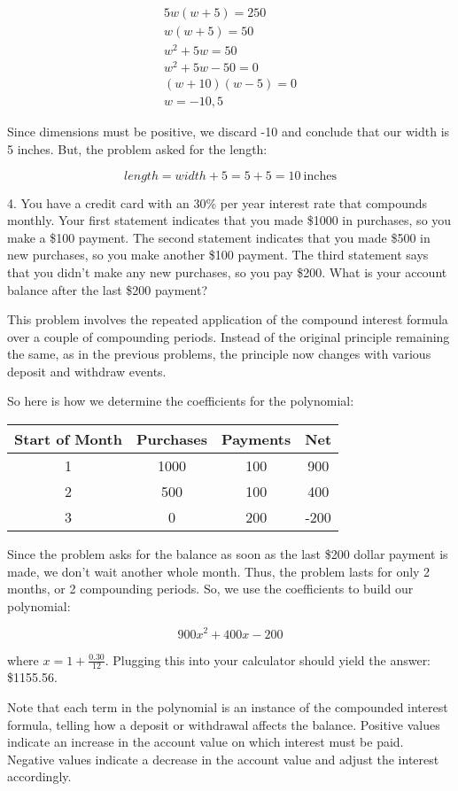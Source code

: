 \documentclass[letterpaper, 12pt]{article}
\begin{document}
\begin{eqnarray*}
5w(w+5)=250 \\
w(w+5)=50 \\
w^2+5w=50 \\
w^2+5w-50=0 \\
(w+10)(w-5)=0 \\
w=-10,5
\end{eqnarray*}

Since dimensions must be positive, we discard -10 and conclude that our width
is 5 inches. But, the problem asked for the length:

\[length=width+5=5+5=10\ \mbox{inches}\]

4. You have a credit card with an 30\% per year interest rate that compounds
monthly. Your first statement indicates that you made \$1000 in purchases, so
you make a \$100 payment.  The second statement indicates that you made \$500 in
new purchases, so you make another \$100 payment. The third statement says that
you didn't make any new purchases, so you pay \$200.  What is your account
balance after the last \$200 payment?

\bigskip

This problem involves the repeated application of the compound interest formula
over a couple of compounding periods.  Instead of the original principle
remaining the same, as in the previous problems, the principle now changes with
various deposit and withdraw events.

So here is how we determine the coefficients for the polynomial:

\bigskip

\begin{tabular}{|c|c|c|c|}
\hline
Start of Month & Purchases & Payments & Net \\
\hline
1 & 1000 & 100 & 900 \\
\hline
2 & 500 & 100 & 400 \\
\hline
3 & 0 & 200 & -200 \\
\hline
\end{tabular}

\bigskip

Since the problem asks for the balance as soon as the last \$200 dollar payment
is made, we don't wait another whole month. Thus, the problem lasts for only
2 months, or 2 compounding periods.  So, we use the coefficients to build our
polynomial:

\[900x^2+400x-200\]

where $x=1+\frac{0.30}{12}$. Plugging this into your calculator should yield
the answer: \$1155.56.

Note that each term in the polynomial is an instance of the compounded interest
formula, telling how a deposit or withdrawal affects the balance. Positive
values indicate an increase in the account value on which interest must be
paid.  Negative values indicate a decrease in the account value and adjust the
interest accordingly.
\end{document}
